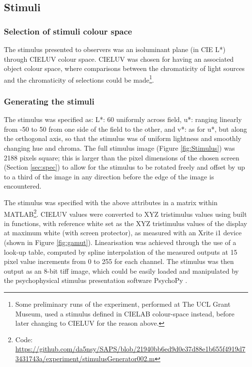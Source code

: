 

\subsection{Stimuli} \label{sec:stimuli}

\subsubsection{Selection of stimuli colour space}

The stimulus presented to observers was an isoluminant plane (in CIE L*) through CIELUV colour space. CIELUV was chosen for having an associated object colour space, where comparisons between the chromaticity of light sources and the chromaticity of selections could be made\footnote{Some preliminary runs of the experiment, performed at The UCL Grant Museum, used a stimulus defined in CIELAB colour-space instead, before later changing to CIELUV for the reason above.}. 

\subsubsection{Generating the stimuli}

The stimulus was specified as: L*: 60 uniformly across field, u*: ranging linearly from -50 to 50 from one side of the field to the other, and v*: as for u*, but along the orthogonal axis, so that the stimulus was of uniform lightness and smoothly changing hue and chroma. The full stimulus image (Figure \ref{fig:Stimulus}) was 2188 pixels square; this is larger than the pixel dimensions of the chosen screen (Section \ref{sec:spec}) to allow for the stimulus to be rotated freely and offset by up to a third of the image in any direction before the edge of the image is encountered. 

The stimulus was specified with the above attributes in a matrix within \gls{MATLAB}\footnote{Code: \url{https://github.com/da5nsy/SAPS/blob/21940bb6ed9d0e37d88e1b655f4919d73431743a/experiment/stimulusGenerator002.m}}. CIELUV values were converted to XYZ tristimulus values using built in functions, with reference white set as the XYZ tristimulus values of the display at maximum white (with screen protector), as measured with an Xrite i1 device (shown in Figure \ref{fig:gamut}). Linearisation was achieved through the use of a look-up table, computed by spline interpolation of the measured outputs at 15 pixel %
value increments from 0 to 255 for each channel. The stimulus was then output as an 8-bit tiff image, which could be easily loaded and manipulated by the psychophysical stimulus presentation software PsychoPy \citep{peirce_psychopypsychophysics_2007}. %

